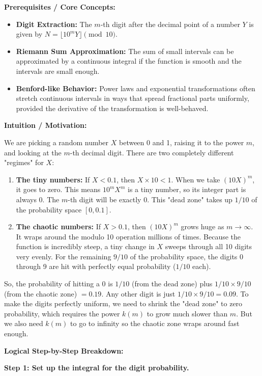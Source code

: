 \begin{solution}
\textbf{Prerequisites / Core Concepts:}
\begin{itemize}
    \item \textbf{Digit Extraction:} The $m$-th digit after the decimal point of a number $Y$ is given by $N = \lfloor 10^m Y \rfloor \pmod{10}$.
    \item \textbf{Riemann Sum Approximation:} The sum of small intervals can be approximated by a continuous integral if the function is smooth and the intervals are small enough.
    \item \textbf{Benford-like Behavior:} Power laws and exponential transformations often stretch continuous intervals in ways that spread fractional parts uniformly, provided the derivative of the transformation is well-behaved.
\end{itemize}

\textbf{Intuition / Motivation:}

We are picking a random number $X$ between 0 and 1, raising it to the power $m$, and looking at the $m$-th decimal digit.
There are two completely different "regimes" for $X$:
\begin{enumerate}
    \item \textbf{The tiny numbers:} If $X < 0.1$, then $X \times 10 < 1$. When we take $(10X)^m$, it goes to zero. This means $10^m X^m$ is a tiny number, so its integer part is always 0. The $m$-th digit will be exactly 0. This "dead zone" takes up $1/10$ of the probability space $[0, 0.1]$.
    \item \textbf{The chaotic numbers:} If $X > 0.1$, then $(10X)^m$ grows huge as $m \to \infty$. It wraps around the modulo 10 operation millions of times. Because the function is incredibly steep, a tiny change in $X$ sweeps through all 10 digits very evenly. For the remaining $9/10$ of the probability space, the digits 0 through 9 are hit with perfectly equal probability ($1/10$ each).
\end{enumerate}
So, the probability of hitting a 0 is $1/10$ (from the dead zone) plus $1/10 \times 9/10$ (from the chaotic zone) $= 0.19$. Any other digit is just $1/10 \times 9/10 = 0.09$.
To make the digits perfectly uniform, we need to shrink the "dead zone" to zero probability, which requires the power $k(m)$ to grow much slower than $m$. But we also need $k(m)$ to go to infinity so the chaotic zone wraps around fast enough.

\textbf{Logical Step-by-Step Breakdown:}

\textbf{Step 1: Set up the integral for the digit probability.}


\end{solution}
